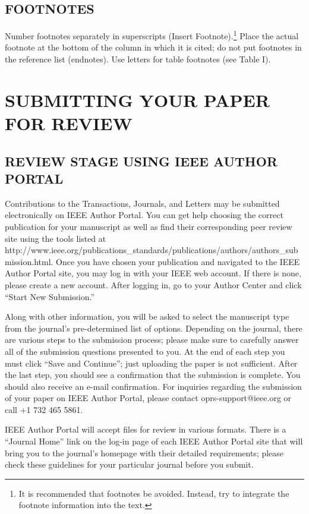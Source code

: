 \documentclass{ieeetmlcn}
\begin{document}
\subsection{FOOTNOTES}
Number footnotes separately in superscripts (Insert\textbar
Footnote).\footnote{It is recommended that footnotes be avoided. Instead,
try to integrate the footnote information into the text.} Place the actual
footnote at the bottom of the column in which it is cited; do not put
footnotes in the reference list (endnotes). Use letters for table footnotes
(see Table I).

\section{SUBMITTING YOUR PAPER FOR REVIEW}

\subsection{REVIEW STAGE USING IEEE AUTHOR PORTAL}

Contributions to the Transactions, Journals, and Letters may be submitted electronically on IEEE Author Portal. You can get help choosing the correct publication for your manuscript as well as find their corresponding peer review site using the tools listed at http://\discretionary{}{}{}www.ieee.org/\discretionary{}{}{}publications\_standards/\discretionary{}{}{}publications/\discretionary{}{}{}authors/\discretionary{}{}{}authors\_submission.html. Once you have chosen your publication and navigated to the IEEE Author Portal site, you may log in with your IEEE web account. If there is none, please create a new account. After logging in, go to your Author Center and click ``Start New Submission.''

Along with other information, you will be asked to select the manuscript type from the journal's pre-determined list of options. Depending on the journal, there are various steps to the submission process; please make sure to carefully answer all of the submission questions presented to you. At the end of each step you must click ``Save and Continue''; just uploading the paper is not sufficient. After the last step, you should see a confirmation that the submission is complete. You should also receive an e-mail confirmation. For inquiries regarding the submission of your paper on IEEE Author Portal, please contact oprs-support@ieee.org or call +1 732 465 5861.

IEEE Author Portal will accept files for review in various formats. There is a ``Journal Home'' link on the log-in page of each IEEE Author Portal site that will bring you to the journal's homepage with their detailed requirements; please check these guidelines for your particular journal before you submit.
\end{document}
